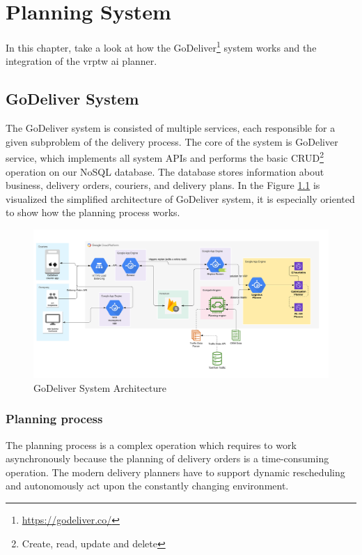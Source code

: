 \chapter{Planning System}

In this chapter, take a look at how the GoDeliver\footnote{\url{https://godeliver.co/}} system works and the integration of the \gls{vrptw} \gls{ai} planner.

\section{GoDeliver System}

The GoDeliver system is consisted of multiple services, each responsible for a given subproblem of the delivery process. The core of the system is GoDeliver service, which implements all system APIs and performs the basic CRUD\footnote{Create, read, update and delete} operation on our NoSQL database. The database stores information about business, delivery orders, couriers, and delivery plans. In the Figure \ref{fig:godeliver-system} is visualized the simplified architecture of GoDeliver system, it is especially oriented to show how the planning process works.

\begin{figure}[ht]
    \centering
    \includegraphics[width=1.0\textwidth]{resources/implementation/godeliver-system.png}
    \caption{GoDeliver System Architecture}
    \label{fig:godeliver-system}
\end{figure}

\subsection{Planning process}
The planning process is a complex operation which requires to work asynchronously because the planning of delivery orders is a time-consuming operation. The modern delivery planners have to support dynamic rescheduling and autonomously act upon the constantly changing environment.

